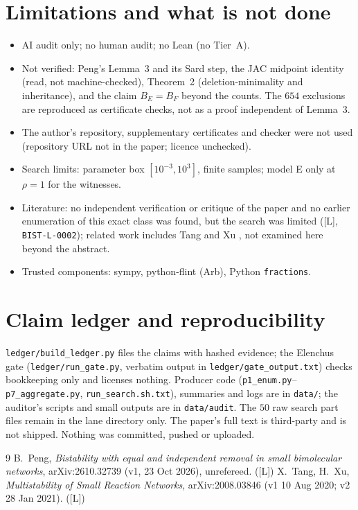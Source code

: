 \documentclass[10pt]{article}
\newcommand{\tier}[1]{\textsf{[#1]}}
\newcommand{\tL}{\tier{L}}
\begin{document}
\section{Limitations and what is not done}\label{sec:lim}
\begin{itemize}\itemsep=1pt
\item AI audit only; no human audit; no Lean (no Tier~A).
\item Not verified: Peng's Lemma~3 and its Sard step, the JAC midpoint identity (read, not machine-checked), Theorem~2 (deletion-minimality and inheritance), and the claim $B_E=B_F$ beyond the counts. The $654$ exclusions are reproduced as certificate checks, not as a proof independent of Lemma~3.
\item The author's repository, supplementary certificates and checker were not used (repository URL not in the paper; licence unchecked).
\item Search limits: parameter box $[10^{-3},10^3]$, finite samples; model E only at $\rho=1$ for the witnesses.
\item Literature: no independent verification or critique of the paper and no earlier enumeration of this exact class was found, but the search was limited (\tL{}, \texttt{BIST-L-0002}); related work includes Tang and Xu \cite{tangxu}, not examined here beyond the abstract.
\item Trusted components: sympy, python-flint (Arb), Python \texttt{fractions}.
\end{itemize}

\section{Claim ledger and reproducibility}\label{sec:ledger}
\texttt{ledger/build\_ledger.py} files the claims with hashed evidence; the Elenchus gate (\texttt{ledger/run\_gate.py}, verbatim output in \texttt{ledger/gate\_output.txt}) checks bookkeeping only and licenses nothing. Producer code (\texttt{p1\_enum.py}--\texttt{p7\_aggregate.py}, \texttt{run\_search.sh.txt}), summaries and logs are in \texttt{data/}; the auditor's scripts and small outputs are in \texttt{data/audit}. The $50$ raw search part files remain in the lane directory only. The paper's full text is third-party and is not shipped. Nothing was committed, pushed or uploaded.

\begin{thebibliography}{9}\small
{} B.\ Peng, \emph{Bistability with equal and independent removal in small bimolecular networks}, arXiv:2610.32739 (v1, 23 Oct 2026), unrefereed. (\tL)
 X.\ Tang, H.\ Xu, \emph{Multistability of Small Reaction Networks}, arXiv:2008.03846 (v1 10 Aug 2020; v2 28 Jan 2021). (\tL)
\end{thebibliography}
\end{document}
